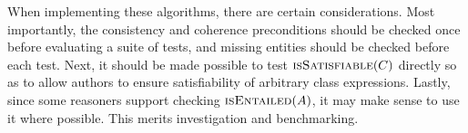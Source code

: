 \documentclass[paper.tex]{subfiles}
\begin{document}
When implementing these algorithms, there are certain considerations.
Most importantly, the consistency and coherence preconditions should be checked once before evaluating a suite of tests, and missing entities should be checked before each test.
Next, it should be made possible to test $\Call{isSatisfiable}{C}$ directly so as to allow authors to ensure satisfiability of arbitrary class expressions.
Lastly, since some reasoners support checking $\Call{isEntailed}{A}$, it may make sense to use it where possible.  This merits investigation and benchmarking.
\end{document}
